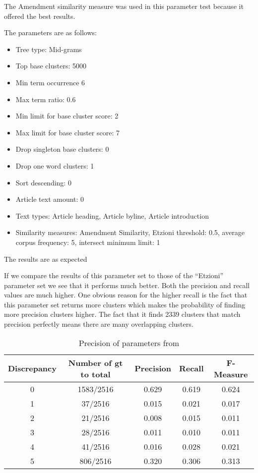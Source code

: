 The Amendment similarity measure was used in this parameter test because it offered the best results.

The parameters are as follows:
\begin{itemize}
  \item Tree type: Mid-grams
  \item Top base clusters: 5000
  \item Min term occurrence 6
  \item Max term ratio: 0.6
  \item Min limit for base cluster score: 2
  \item Max limit for base cluster score: 7
  \item Drop singleton base clusters: 0
  \item Drop one word clusters: 1
  \item Sort descending: 0
  \item Article text amount: 0
  \item Text types: Article heading, Article byline, Article introduction
  \item Similarity measures: Amendment Similarity, Etzioni threshold: 0.5, average corpus frequency: 5, intersect minimum limit: 1
\end{itemize}

The results are as expected

If we compare the results of this parameter set to those of the ``Etzioni'' parameter set we see that it performs much better. Both the precision and recall values are much higher. One obvious reason for the higher recall is the fact that this parameter set returns more clusters which makes the probability of finding more precision clusters higher. The fact that it finds 2339 clusters that match precision perfectly means there are many overlapping clusters.

\begin{table}[H]
\begin{center}
\begin{tabular}{|c|c|ccc|}
\hline
Discrepancy & Number of gt to total & Precision & Recall & F-Measure\\ 
\hline
0&   1583/2516&   0.629&   0.619 & 0.624\\ 
1&   37/2516&   0.015&   0.021&    0.017\\ 
2&   21/2516&   0.008&   0.015&    0.011\\ 
3&   28/2516&   0.011&   0.010&    0.011\\ 
4&   41/2516&   0.016&   0.028&    0.021\\ 
5&   806/2516&    0.320&   0.306&    0.313\\ 
\hline
\end{tabular}
\end{center}
\caption{Precision of parameters from \citeauthor{Moe2014compact}}
\label{tab:klimaukenparametersgroundtruth}
\end{table}

